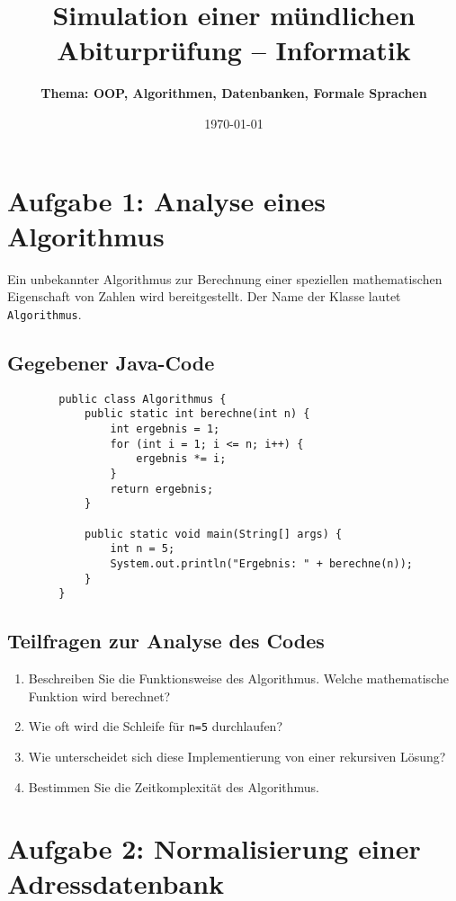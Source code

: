 \documentclass[a4paper,12pt]{article}
\begin{document}
	
	\title{\textbf{Simulation einer mündlichen Abiturprüfung -- Informatik}}
	\author{\textbf{Thema: OOP, Algorithmen, Datenbanken, Formale Sprachen}}
	\date{\today}
	\maketitle
	
	\section*{Aufgabe 1: Analyse eines Algorithmus}
	
	Ein unbekannter Algorithmus zur Berechnung einer speziellen mathematischen Eigenschaft von Zahlen wird bereitgestellt. Der Name der Klasse lautet \texttt{Algorithmus}.
	
	\subsection*{Gegebener Java-Code}
	
	\begin{verbatim}
		public class Algorithmus {
			public static int berechne(int n) {
				int ergebnis = 1;
				for (int i = 1; i <= n; i++) {
					ergebnis *= i;
				}
				return ergebnis;
			}
			
			public static void main(String[] args) {
				int n = 5;
				System.out.println("Ergebnis: " + berechne(n));
			}
		}
	\end{verbatim}
	
	\subsection*{Teilfragen zur Analyse des Codes}
	
	\begin{enumerate}
		\item Beschreiben Sie die Funktionsweise des Algorithmus. Welche mathematische Funktion wird berechnet?
		\item Wie oft wird die Schleife für \texttt{n=5} durchlaufen?
		\item Wie unterscheidet sich diese Implementierung von einer rekursiven Lösung?
		\item Bestimmen Sie die Zeitkomplexität des Algorithmus.
	\end{enumerate}
	
	\section*{Aufgabe 2: Normalisierung einer Adressdatenbank}
	
\end{document}
